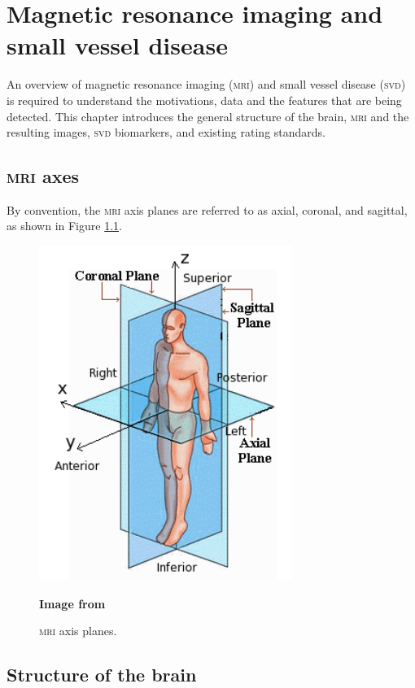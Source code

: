 %
%



\chapter{Magnetic resonance imaging and small vessel disease}\label{mri_svd_intro}

An overview of magnetic resonance imaging (\textsc{mri}) and small vessel disease (\textsc{svd}) is required to understand the motivations, data and the features that are being detected. This chapter introduces the general structure of the brain, \textsc{mri} and the resulting images, \textsc{svd} biomarkers, and existing rating standards.

\section{\textsc{mri} axes}

By convention, the \textsc{mri} axis planes are referred to as axial, coronal, and sagittal, as shown in Figure \ref{svd-axes}.

\begin{figure}[ht]
	\centering
	\includegraphics[scale=0.8]{Images/2_axes.png}
	\caption{\textsc{mri} axis planes.}
	\small \textbf{Image from}
	\label{svd-axes}
\end{figure}

\section{Structure of the brain}\label{svd-brain}

